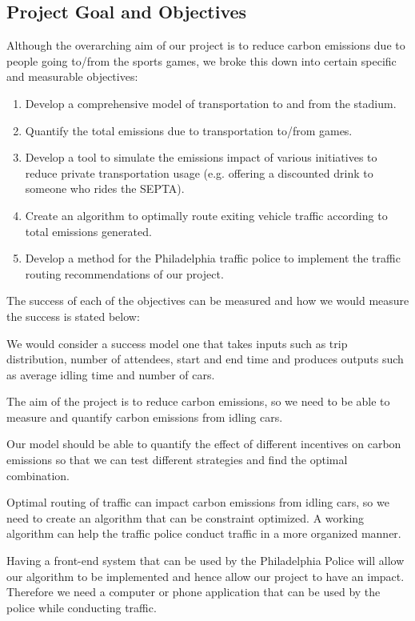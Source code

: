 \documentclass[draft,12pt,titlepage]{article}
\begin{document}
\subsection{Project Goal and Objectives}
Although the overarching aim of our project is to reduce carbon emissions due to people
going to/from the sports games, we broke this down into certain specific and measurable
objectives:

\begin{enumerate}
  \item Develop a comprehensive model of transportation to and from the stadium.
  \item Quantify the total emissions due to transportation to/from games.
  \item Develop a tool to simulate the emissions impact of various initiatives to reduce
private transportation usage (e.g. offering a discounted drink to someone who rides
the SEPTA).
  \item Create an algorithm to optimally route exiting vehicle traffic according to total
emissions generated.
  \item Develop a method for the Philadelphia traffic police to implement the traffic routing
recommendations of our project.
\end{enumerate}

The success of each of the objectives can be measured and how we would measure the
success is stated below:

We would consider a success model one that takes inputs such as trip distribution, number of
attendees, start and end time and produces outputs such as average idling time and number of
cars.

The aim of the project is to reduce carbon emissions, so we need to be able to measure and
quantify carbon emissions from idling cars.

Our model should be able to quantify the effect of different incentives on carbon emissions so
that we can test different strategies and find the optimal combination.

Optimal routing of traffic can impact carbon emissions from idling cars, so we need to create
an algorithm that can be constraint optimized. A working algorithm can help the traffic police
conduct traffic in a more organized manner.

Having a front-end system that can be used by the Philadelphia Police will allow our
algorithm to be implemented and hence allow our project to have an impact. Therefore we
need a computer or phone application that can be used by the police while conducting traffic.
\end{document}
